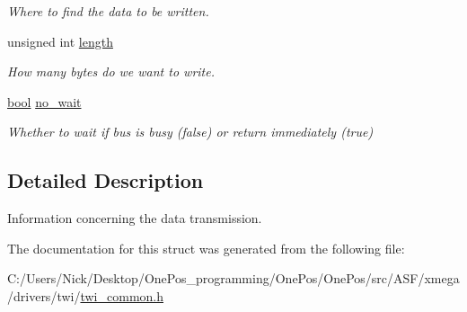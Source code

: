 \begin{DoxyCompactItemize}
\begin{DoxyCompactList}\small\item\em Where to find the data to be written. \end{DoxyCompactList}\item 
\hypertarget{structtwi__package__t_a6cbe7e5b49a559549995f88d51bcce56}{unsigned int \hyperlink{structtwi__package__t_a6cbe7e5b49a559549995f88d51bcce56}{length}}\label{structtwi__package__t_a6cbe7e5b49a559549995f88d51bcce56}

\begin{DoxyCompactList}\small\item\em How many bytes do we want to write. \end{DoxyCompactList}\item 
\hypertarget{structtwi__package__t_aa25940720cc1d8b2d50200122b4d52b1}{\hyperlink{group__group__xmega__utils_ga97a80ca1602ebf2303258971a2c938e2}{bool} \hyperlink{structtwi__package__t_aa25940720cc1d8b2d50200122b4d52b1}{no\-\_\-wait}}\label{structtwi__package__t_aa25940720cc1d8b2d50200122b4d52b1}

\begin{DoxyCompactList}\small\item\em Whether to wait if bus is busy (false) or return immediately (true) \end{DoxyCompactList}\end{DoxyCompactItemize}


\subsection{Detailed Description}
Information concerning the data transmission. 

The documentation for this struct was generated from the following file\-:\begin{DoxyCompactItemize}
\item 
C\-:/\-Users/\-Nick/\-Desktop/\-One\-Pos\-\_\-programming/\-One\-Pos/\-One\-Pos/src/\-A\-S\-F/xmega/drivers/twi/\hyperlink{twi__common_8h}{twi\-\_\-common.\-h}\end{DoxyCompactItemize}
